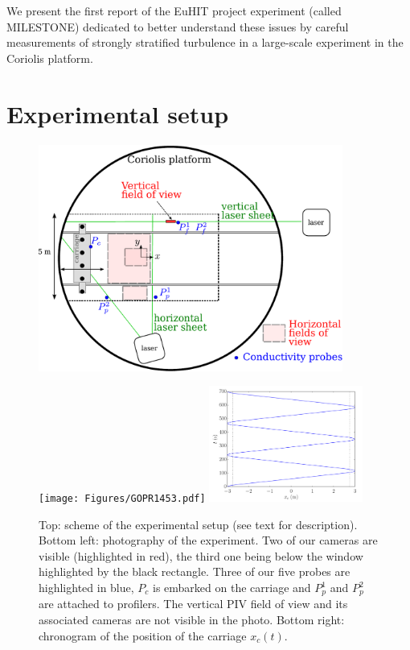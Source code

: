\noindent We present the first report of the EuHIT project experiment (called
MILESTONE) dedicated to better understand these issues by careful measurements
of strongly stratified turbulence in a large-scale experiment in the Coriolis
platform.


\section{Experimental setup}

\begin{figure}[htb]
\centerline{
\includegraphics[width=10cm]{Figures/scheme_exp_grid_MILESTONE_Euhit.pdf}}
\vspace{5mm}
\centerline{
\texttt{[image: Figures/GOPR1453.pdf]}
\includegraphics[width=0.45\textwidth]{Figures/fig_movement_carriage.pdf}}
\caption{Top: scheme of the experimental setup (see text for
description). Bottom left: photography of the experiment. Two of our cameras
are visible (highlighted in red), the third one being below the window
highlighted by the black rectangle. Three of our five probes are highlighted in
blue, $P_c$ is embarked on the carriage and $P_p^1$ and $P_p^2$ are attached to
profilers. The vertical PIV field of view and its associated cameras are not
visible in the photo. Bottom right: chronogram of the position of the carriage
$x_c(t)$.}
\label{fig:exp}
\end{figure}


